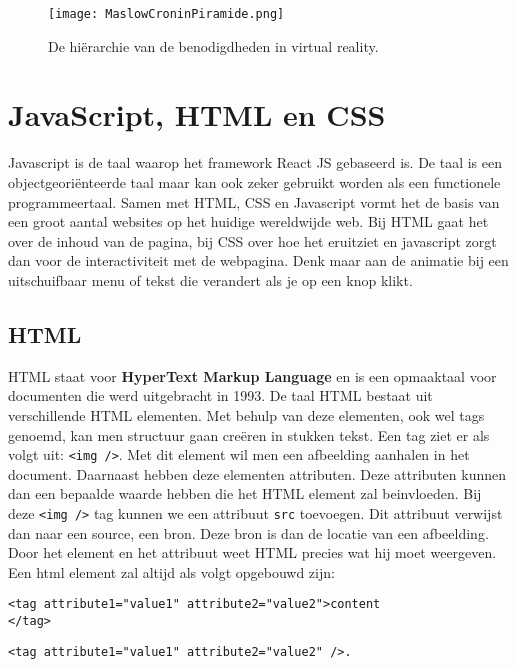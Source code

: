 \begin{figure}[h]
	\centering
	\texttt{[image: MaslowCroninPiramide.png]}
	\caption{De hiërarchie van de benodigdheden in virtual reality.}
	\label{fig:maslowcroninpiramide}
\end{figure}

\section{JavaScript, HTML en CSS}
\label{sec:frameworks}
Javascript is de taal waarop het framework React JS gebaseerd is. De taal is een objectgeoriënteerde taal maar kan ook zeker gebruikt worden als een functionele programmeertaal. Samen met HTML, CSS en Javascript vormt het de basis van een groot aantal websites op het huidige wereldwijde web. Bij HTML gaat het over de inhoud van de pagina, bij CSS over hoe het eruitziet en javascript zorgt dan voor de interactiviteit met de webpagina. Denk maar aan de animatie bij een uitschuifbaar menu of tekst die verandert als je op een knop klikt.

\subsection{HTML}
HTML staat voor \textbf{HyperText Markup Language} en is een opmaaktaal voor documenten die werd uitgebracht in 1993. De taal HTML bestaat uit verschillende HTML elementen. Met behulp van deze elementen, ook wel tags genoemd, kan men structuur gaan creëren in stukken tekst. Een tag ziet er als volgt uit: \lstinline[basicstyle=\ttfamily\color{red}]|<img />|. Met dit element wil men een afbeelding aanhalen in het document. Daarnaast hebben deze elementen attributen. Deze attributen kunnen dan een bepaalde waarde hebben die het HTML element zal beinvloeden. Bij deze \lstinline[basicstyle=\ttfamily\color{red}]|<img />| tag kunnen we een attribuut \lstinline[basicstyle=\ttfamily\color{red}]|src| toevoegen. Dit attribuut verwijst dan naar een source, een bron. Deze bron is dan de locatie van een afbeelding. Door het element en het attribuut weet HTML precies wat hij moet weergeven. Een html element zal altijd als volgt opgebouwd zijn: 

\begin{lstlisting}[frame=single, caption=HTML Element voorbeeld]
<tag attribute1="value1" attribute2="value2">content
</tag>
\end{lstlisting}
\begin{lstlisting}[frame=single, caption=HTML Element voorbeeld]
<tag attribute1="value1" attribute2="value2" />.
\end{lstlisting}

